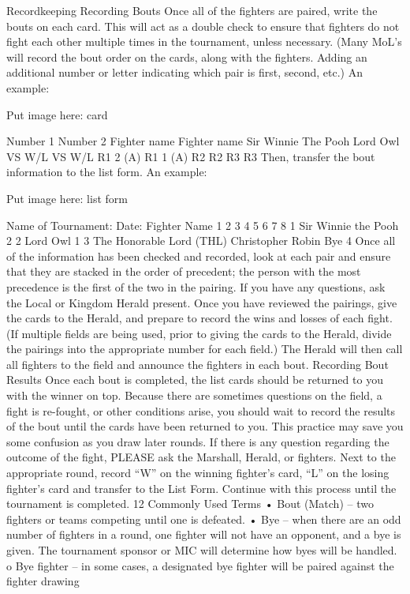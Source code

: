 \documentclass{article}
\begin{document}
Recordkeeping
Recording Bouts
Once all of the fighters are paired, write the bouts on each card. This will act as a double check to ensure
that fighters do not fight each other multiple times in the tournament, unless necessary. (Many MoL’s will
record the bout order on the cards, along with the fighters. Adding an additional number or letter
indicating which pair is first, second, etc.) An example:

Put image here: card

Number 1 Number 2
Fighter name Fighter name
Sir
Winnie The Pooh Lord Owl
VS W/L VS W/L
R1 2 (A) R1 1 (A)
R2 R2
R3 R3
Then, transfer the bout information to the list form. An example:

Put image here: list form

Name of Tournament: Date:
Fighter Name 1 2 3 4 5 6 7 8
1 Sir Winnie the Pooh 2
2 Lord Owl 1
3
The Honorable Lord (THL)
Christopher Robin Bye
4
Once all of the information has been checked and recorded, look at each pair and ensure that they are
stacked in the order of precedent; the person with the most precedence is the first of the two in the pairing.
If you have any questions, ask the Local or Kingdom Herald present. Once you have reviewed the
pairings, give the cards to the Herald, and prepare to record the wins and losses of each fight. (If multiple
fields are being used, prior to giving the cards to the Herald, divide the pairings into the appropriate
number for each field.)
The Herald will then call all fighters to the field and announce the fighters in each bout.
Recording Bout Results
Once each bout is completed, the list cards should be returned to you with the winner on top. Because
there are sometimes questions on the field, a fight is re-fought, or other conditions arise, you should wait
to record the results of the bout until the cards have been returned to you. This practice may save you
some confusion as you draw later rounds. If there is any question regarding the outcome of the fight,
PLEASE ask the Marshall, Herald, or fighters.
Next to the appropriate round, record “W” on the winning fighter’s card, “L” on the losing fighter’s card
and transfer to the List Form.
Continue with this process until the tournament is completed.
12
Commonly Used Terms
• Bout (Match) – two fighters or teams competing until one is defeated.
• Bye – when there are an odd number of fighters in a round, one fighter will not have an opponent, and
a bye is given. The tournament sponsor or MIC will determine how byes will be handled.
o Bye fighter – in some cases, a designated bye fighter will be paired against the fighter drawing
\end{document}
